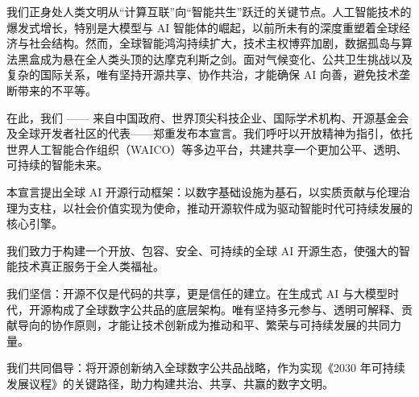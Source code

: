 我们正身处人类文明从“计算互联”向“智能共生”跃迁的关键节点。人工智能技术的爆发式增长，特别是大模型与 AI 智能体的崛起，以前所未有的深度重塑着全球经济与社会结构。然而，全球智能鸿沟持续扩大，技术主权博弈加剧，数据孤岛与算法黑盒成为悬在全人类头顶的达摩克利斯之剑。面对气候变化、公共卫生挑战以及复杂的国际关系，唯有坚持开源共享、协作共治，才能确保 AI 向善，避免技术垄断带来的不平等。

在此，我们 —— 来自中国政府、世界顶尖科技企业、国际学术机构、开源基金会及全球开发者社区的代表——郑重发布本宣言。我们呼吁以开放精神为指引，依托世界人工智能合作组织（WAICO）等多边平台，共建共享一个更加公平、透明、可持续的智能未来。

本宣言提出全球 AI 开源行动框架：以数字基础设施为基石，以实质贡献与伦理治理为支柱，以社会价值实现为使命，推动开源软件成为驱动智能时代可持续发展的核心引擎。

我们致力于构建一个开放、包容、安全、可持续的全球 AI 开源生态，使强大的智能技术真正服务于全人类福祉。

我们坚信：开源不仅是代码的共享，更是信任的建立。在生成式 AI 与大模型时代，开源构成了全球数字公共品的底层架构。唯有坚持多元参与、透明可解释、贡献导向的协作原则，才能让技术创新成为推动和平、繁荣与可持续发展的共同力量。

我们共同倡导：将开源创新纳入全球数字公共品战略，作为实现《2030 年可持续发展议程》的关键路径，助力构建共治、共享、共赢的数字文明。
